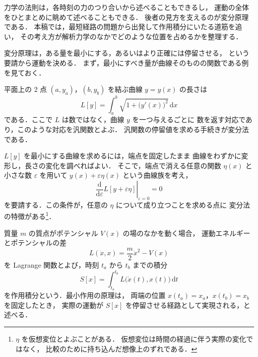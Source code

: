 \documentclass[lualatex,paper=b5j,fontsize=10pt,twoside]{jlreq}
\begin{document}
\setcounter{page}{5}

\MKMakeTitle
\MKArticleReset

力学の法則は，各時刻の力のつり合いから述べることもできるし，
運動の全体をひとまとめに眺めて述べることもできる．
後者の見方を支えるのが変分原理である．
本稿では，最短経路の問題から出発して作用積分にいたる道筋を追い，
その考え方が解析力学のなかでどのような位置を占めるかを整理する．


変分原理は，ある量を最小にする，あるいはより正確には停留させる，
という要請から運動を決める．
まず，最小にすべき量が曲線そのものの関数である例を見ておく．


平面上の 2 点 $(a,y_a)$，$(b,y_b)$ を結ぶ曲線 $y=y(x)$ の長さは
\begin{equation}
  L[y]=\int_a^b\sqrt{1+\bigl(y'(x)\bigr)^2}\,\mathrm{d}x
\end{equation}
である．ここで $L$ は数ではなく，曲線 $y$ を一つ与えるごとに
数を返す対応であり，このような対応を汎関数とよぶ．
汎関数の停留値を求める手続きが変分法である．

$L[y]$ を最小にする曲線を求めるには，端点を固定したまま
曲線をわずかに変形し，長さの変化を調べればよい．
そこで，端点で消える任意の関数 $\eta(x)$ と小さな数 $\varepsilon$ を用いて
$y(x)+\varepsilon\eta(x)$ という曲線族を考え，
\begin{equation}
  \left.\dfrac{\mathrm{d}}{\mathrm{d}\varepsilon}
    L[y+\varepsilon\eta]\right|_{\varepsilon=0}=0
\end{equation}
を要請する．この条件が，任意の $\eta$ について成り立つことを求める点に
変分法の特徴がある\footnote{$\eta$ を仮想変位とよぶことがある．
仮想変位は時間の経過に伴う実際の変化ではなく，
比較のために持ち込んだ想像上のずれである．}．


質量 $m$ の質点がポテンシャル $V(x)$ の場のなかを動く場合，
運動エネルギーとポテンシャルの差
\begin{equation}
  L(\dot{x},x)=\dfrac{m}{2}\dot{x}^2-V(x)
\end{equation}
を Lagrange 関数とよび，時刻 $t_a$ から $t_b$ までの積分
\begin{equation}
  S[x]=\int_{t_a}^{t_b}L\bigl(\dot{x}(t),x(t)\bigr)\,\mathrm{d}t
\end{equation}
を作用積分という．最小作用の原理は，
両端の位置 $x(t_a)=x_a$，$x(t_b)=x_b$ を固定したとき，
実際の運動が $S[x]$ を停留させる経路として実現される，と述べる．
\end{document}
